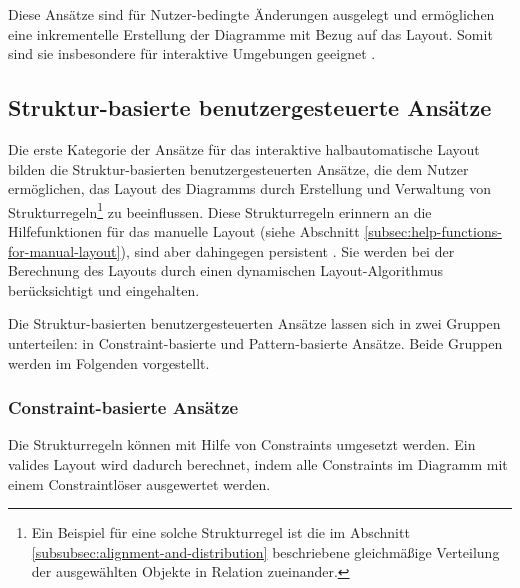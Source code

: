Diese Ansätze sind für Nutzer-bedingte Änderungen ausgelegt und ermöglichen eine inkrementelle Erstellung der Diagramme mit Bezug auf das Layout. Somit sind sie insbesondere für interaktive Umgebungen geeignet \cite{Arvo02Techniques, GladischSchumann14Semi-Automatic, Wybrow08Using}.



\subsection{Struktur-basierte benutzergesteuerte Ansätze}
\label{subsec:structure-based-user-controlled-approaches}

Die erste Kategorie der Ansätze für das interaktive halbautomatische Layout bilden die Struktur-basierten benutzergesteuerten Ansätze, die dem Nutzer ermöglichen, das Layout des Diagramms durch Erstellung und Verwaltung von Strukturregeln\footnote{Ein Beispiel für eine solche Strukturregel ist die im Abschnitt \ref{subsubsec:alignment-and-distribution} beschriebene gleichmäßige Verteilung der ausgewählten Objekte in Relation zueinander.} zu beeinflussen. Diese Strukturregeln erinnern an die Hilfefunktionen für das manuelle Layout (siehe Abschnitt \ref{subsec:help-functions-for-manual-layout}), sind aber dahingegen persistent \cite{Wybrow08Using}. Sie werden bei der Berechnung des Layouts durch einen dynamischen Layout-Algorithmus berücksichtigt und eingehalten.

Die Struktur-basierten benutzergesteuerten Ansätze lassen sich in zwei Gruppen unterteilen: in Constraint-basierte und Pattern-basierte Ansätze. Beide Gruppen werden im Folgenden vorgestellt.

\subsubsection{Constraint-basierte Ansätze}
\label{subsubsec:constraint-based-approaches}

Die Strukturregeln können mit Hilfe von Constraints umgesetzt werden. Ein valides Layout wird dadurch berechnet, indem alle Constraints im Diagramm mit einem Constraintlöser ausgewertet werden.




